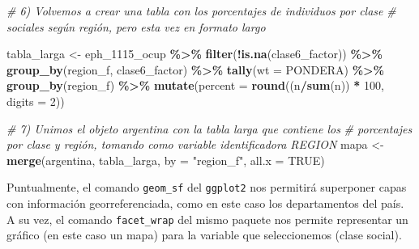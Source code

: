\documentclass[
]{article}
\newenvironment{Shaded}{\begin{snugshade}}{\end{snugshade}}
\newcommand{\AttributeTok}[1]{\textcolor[rgb]{0.13,0.29,0.53}{#1}}
\newcommand{\CommentTok}[1]{\textcolor[rgb]{0.56,0.35,0.01}{\textit{#1}}}
\newcommand{\ConstantTok}[1]{\textcolor[rgb]{0.56,0.35,0.01}{#1}}
\newcommand{\DecValTok}[1]{\textcolor[rgb]{0.00,0.00,0.81}{#1}}
\newcommand{\FunctionTok}[1]{\textcolor[rgb]{0.13,0.29,0.53}{\textbf{#1}}}
\newcommand{\NormalTok}[1]{#1}
\newcommand{\OtherTok}[1]{\textcolor[rgb]{0.56,0.35,0.01}{#1}}
\newcommand{\SpecialCharTok}[1]{\textcolor[rgb]{0.81,0.36,0.00}{\textbf{#1}}}
\newcommand{\StringTok}[1]{\textcolor[rgb]{0.31,0.60,0.02}{#1}}
\begin{document}
\begin{Shaded}
\begin{Highlighting}[]
\CommentTok{\# 6) Volvemos a crear una tabla con los porcentajes de individuos por clase}
\CommentTok{\# sociales según región, pero esta vez en formato largo}

\NormalTok{tabla\_larga }\OtherTok{\textless{}{-}}\NormalTok{ eph\_1115\_ocup }\SpecialCharTok{\%\textgreater{}\%}
    \FunctionTok{filter}\NormalTok{(}\SpecialCharTok{!}\FunctionTok{is.na}\NormalTok{(clase6\_factor)) }\SpecialCharTok{\%\textgreater{}\%}
    \FunctionTok{group\_by}\NormalTok{(region\_f, clase6\_factor) }\SpecialCharTok{\%\textgreater{}\%}
    \FunctionTok{tally}\NormalTok{(}\AttributeTok{wt =}\NormalTok{ PONDERA) }\SpecialCharTok{\%\textgreater{}\%}
    \FunctionTok{group\_by}\NormalTok{(region\_f) }\SpecialCharTok{\%\textgreater{}\%}
    \FunctionTok{mutate}\NormalTok{(}\AttributeTok{percent =} \FunctionTok{round}\NormalTok{((n}\SpecialCharTok{/}\FunctionTok{sum}\NormalTok{(n)) }\SpecialCharTok{*} \DecValTok{100}\NormalTok{, }\AttributeTok{digits =} \DecValTok{2}\NormalTok{))}

\CommentTok{\# 7) Unimos el objeto \textquotesingle{}argentina\textquotesingle{} con la tabla larga que contiene los}
\CommentTok{\# porcentajes por clase y región, tomando como variable identificadora REGION}
\NormalTok{mapa }\OtherTok{\textless{}{-}} \FunctionTok{merge}\NormalTok{(argentina, tabla\_larga, }\AttributeTok{by =} \StringTok{"region\_f"}\NormalTok{, }\AttributeTok{all.x =} \ConstantTok{TRUE}\NormalTok{)}
\end{Highlighting}
\end{Shaded}

Puntualmente, el comando \texttt{geom\_sf} del \texttt{ggplot2} nos permitirá superponer capas con información georreferenciada, como en este caso los departamentos del país. A su vez, el comando \texttt{facet\_wrap} del mismo paquete nos permite representar un gráfico (en este caso un mapa) para la variable que seleccionemos (clase social).
\end{document}
